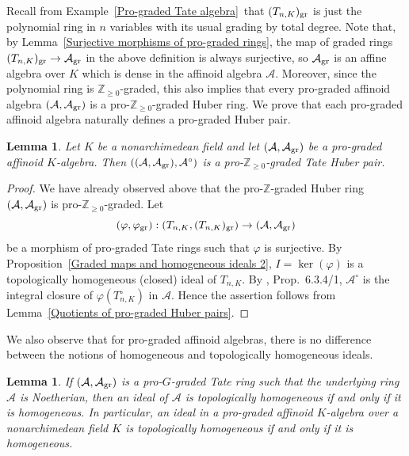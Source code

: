 \documentclass[12pt,twoside,a4paper]{article}
\newtheorem{lemma}[thm]{Lemma}
\theoremstyle{definition}
\theoremstyle{remark}
\newcommand\gr{{\rm gr}}
\begin{document}
Recall from Example~\ref{Pro-graded Tate algebra} that $(T_{n, K})_{\gr}$ is just the polynomial ring in $n$ variables with its usual grading by total degree. Note that, by Lemma~\ref{Surjective morphisms of pro-graded rings}, the map of graded rings $(T_{n, K})_{\gr}\to \mathcal{A}_{\gr}$ in the above definition is always surjective, so $\mathcal{A}_{\gr}$ is an affine algebra over $K$ which is dense in the affinoid algebra $\mathcal{A}$. Moreover, since the polynomial ring is $\mathbb{Z}_{\geq0}$-graded, this also implies that every pro-graded affinoid algebra $(\mathcal{A}, \mathcal{A}_{\gr})$ is a pro-$\mathbb{Z}_{\geq0}$-graded Huber ring. We prove that each pro-graded affinoid algebra naturally defines a pro-graded Huber pair.
\begin{lemma}\label{Pro-graded affinoid algebras define pro-graded Huber pairs}Let $K$ be a nonarchimedean field and let $(\mathcal{A}, \mathcal{A}_{\gr})$ be a pro-graded affinoid $K$-algebra. Then $((\mathcal{A}, \mathcal{A}_{\gr}), \mathcal{A}^{\circ})$ is a pro-$\mathbb{Z}_{\geq0}$-graded Tate Huber pair.\end{lemma}
\begin{proof}We have already observed above that the pro-$\mathbb{Z}$-graded Huber ring $(\mathcal{A}, \mathcal{A}_{\gr})$ is pro-$\mathbb{Z}_{\geq0}$-graded. Let \begin{equation*}(\varphi, \varphi_{\gr}): (T_{n, K}, (T_{n, K})_{\gr})\to (\mathcal{A}, \mathcal{A}_{\gr})\end{equation*}be a morphism of pro-graded Tate rings such that $\varphi$ is surjective. By Proposition~\ref{Graded maps and homogeneous ideals 2}, $I=\ker(\varphi)$ is a topologically homogeneous (closed) ideal of $T_{n, K}$. By \cite{BGR}, Prop.~6.3.4/1, $\mathcal{A}^{\circ}$ is the integral closure of $\varphi(T_{n, K}^{\circ})$ in $\mathcal{A}$. Hence the assertion follows from Lemma~\ref{Quotients of pro-graded Huber pairs}.
\end{proof}
We also observe that for pro-graded affinoid algebras, there is no difference between the notions of homogeneous and topologically homogeneous ideals.
\begin{lemma}\label{Noetherian Banach algebras and homogeneous ideals}If $(\mathcal{A}, \mathcal{A}_{\gr})$ is a pro-$G$-graded Tate ring such that the underlying ring $\mathcal{A}$ is Noetherian, then an ideal of $\mathcal{A}$ is topologically homogeneous if and only if it is homogeneous. In particular, an ideal in a pro-graded affinoid $K$-algebra over a nonarchimedean field $K$ is topologically homogeneous if and only if it is homogeneous.\end{lemma}
\end{document}
